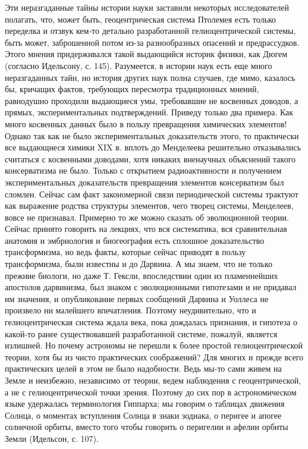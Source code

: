 Эти неразгаданные тайны истории науки заставили некоторых
исследователей полагать, что, может быть, геоцентрическая система
Птолемея есть только переделка и отзвук кем-то детально разработанной
гелиоцентрической системы, быть может, заброшенной потом из-за
разнообразных опасений и предрассудков. Этого мнения придерживался
такой выдающийся историк физики, как Дюгем (согласно Идельсону, с.
145). Разумеется, в истории наук есть еще много неразгаданных тайн, но
история других наук полна случаев, где мимо, казалось бы, кричащих
фактов, требующих пересмотра традиционных мнений, равнодушно проходили
выдающиеся умы, требовавшие не косвенных доводов, а прямых,
экспериментальных подтверждений. Приведу только два примера. Как много
косвенных данных было в пользу превращения химических элементов!
Однако так как не было экспериментальных доказательств этого, то
практически все выдающиеся химики XIX в. вплоть до Менделеева
решительно отказывались считаться с косвенными доводами, хотя никаких
вненаучных объяснений такого консерватизма не было. Только с открытием
радиоактивности и получением экспериментальных доказательств
превращения элементов консерватизм был сломлен. Сейчас сам факт
закономерной связи периодической системы трактуют как выражение
родства структуры элементов, чего творец системы, Менделеев, вовсе не
признавал. Примерно то же можно сказать об эволюционной теории. Сейчас
принято говорить на лекциях, что вся систематика, вся сравнительная
анатомия и эмбриология и биогеография есть сплошное доказательство
трансформизма, но ведь факты, которые сейчас приводят в пользу
трансформизма, были известны и до Дарвина. А мы знаем, что не только
прежние биологи, но даже Т. Гексли, впоследствии один из пламеннейших
апостолов дарвинизма, был знаком с эволюционными гипотезами и не
придавал им значения, и опубликование первых сообщений Дарвина и
Уоллеса не произвело ни малейшего впечатления. Поэтому неудивительно,
что и гелиоцентрическая система ждала века, пока дождалась признания,
и гипотеза о какой-то ранее существовавшей разработанной системе,
пожалуй, является излишней. Но почему астрономы не перешли к более
простой гелиоцентрической теории, хотя бы из чисто практических
соображений? Для многих и прежде всего практических целей в этом не
было надобности. Ведь мы-то сами живем на Земле и неизбежно,
независимо от теории, ведем наблюдения с геоцентрической, а не с
гелиоцентрической точки зрения. Поэтому до сих пор в астрономическом
языке удержалась терминология Гиппарха; мы говорим о таблицах движения
Солнца, о моментах вступления Солнца в знаки зодиака, о перигее и
апогее солнечной орбиты, вместо того чтобы говорить о перигелии и
афелии орбиты Земли (Идельсон, с. 107).

